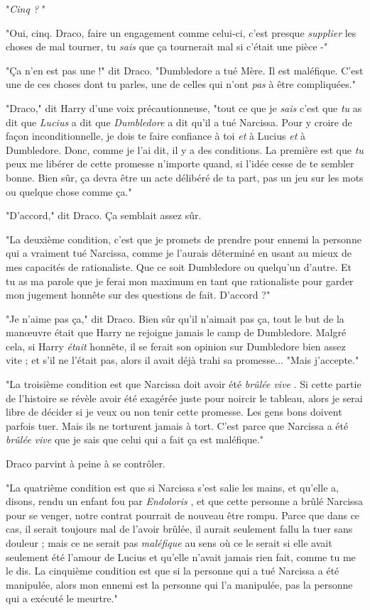 "\emph{Cinq ?} "

"Oui, cinq. Draco, faire un engagement comme celui-ci, c'est presque \emph{supplier}  les choses de mal tourner, tu \emph{sais}  que ça tournerait mal si c'était une pièce -"

"Ça n'en est pas une !" dit Draco. "Dumbledore a tué Mère. Il est maléfique. C'est une de ces choses dont tu parles, une de celles qui n'ont \emph{pas}  à être compliquées."

"Draco," dit Harry d'une voix précautionneuse, "tout ce que je \emph{sais}  c'est que \emph{tu}  as dit que \emph{Lucius}  a dit que \emph{Dumbledore}  a dit qu'il a tué Narcissa. Pour y croire de façon inconditionnelle, je dois te faire confiance à toi \emph{et}  à Lucius \emph{et}  à Dumbledore. Donc, comme je l'ai dit, il y a des conditions. La première est que \emph{tu}  peux me libérer de cette promesse n'importe quand, si l'idée cesse de te sembler bonne. Bien sûr, ça devra être un acte délibéré de ta part, pas un jeu sur les mots ou quelque chose comme ça."

"D'accord," dit Draco. Ça semblait assez sûr.

"La deuxième condition, c'est que je promets de prendre pour ennemi la personne qui a vraiment tué Narcissa, comme je l'aurais déterminé en usant au mieux de mes capacités de rationaliste. Que ce soit Dumbledore ou quelqu'un d'autre. Et tu as ma parole que je ferai mon maximum en tant que rationaliste pour garder mon jugement honnête sur des questions de fait. D'accord ?"

"Je n'aime pas ça," dit Draco. Bien sûr qu'il n'aimait pas ça, tout le but de la manœuvre était que Harry ne rejoigne jamais le camp de Dumbledore. Malgré cela, si Harry \emph{était}  honnête, il se ferait son opinion sur Dumbledore bien assez vite ; et s'il ne l'était pas, alors il avait déjà trahi sa promesse... "Mais j'accepte."

"La troisième condition est que Narcissa doit avoir été \emph{brûlée vive} . Si cette partie de l'histoire se révèle avoir été exagérée juste pour noircir le tableau, alors je serai libre de décider si je veux ou non tenir cette promesse. Les gens bons doivent parfois tuer. Mais ils ne torturent jamais à tort. C'est parce que Narcissa a été \emph{brûlée vive}  que je sais que celui qui a fait ça est maléfique."

Draco parvint à peine à se contrôler.

"La quatrième condition est que si Narcissa s'est salie les mains, et qu'elle a, disons, rendu un enfant fou par \emph{Endoloris} , et que cette personne a brûlé Narcissa pour se venger, notre contrat pourrait de nouveau être rompu. Parce que dans ce cas, il serait toujours mal de l'avoir brûlée, il aurait seulement fallu la tuer sans douleur ; mais ce ne serait pas \emph{maléfique}  au sens où ce le serait si elle avait seulement été l'amour de Lucius et qu'elle n'avait jamais rien fait, comme tu me le dis. La cinquième condition est que si la personne qui a tué Narcissa a été manipulée, alors mon ennemi est la personne qui l'a manipulée, pas la personne qui a exécuté le meurtre."

